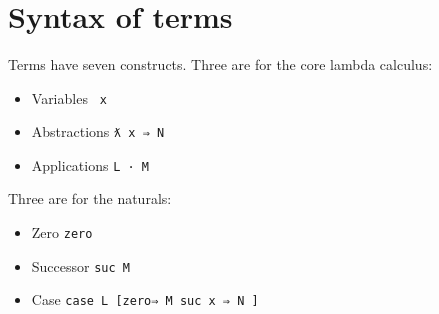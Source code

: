 \begin{fence}
\begin{code}
\AgdaSymbol{)}\<%
\\
\>[0]\AgdaSpace{}%
\AgdaSpace{}%
\AgdaSpace{}%
\AgdaSpace{}%
\AgdaSymbol{(}\AgdaSymbol{;}\AgdaSpace{}%
\AgdaSymbol{;}\AgdaSpace{}%
\AgdaSymbol{)}\<%
\\
\>[0]\AgdaSpace{}%
\AgdaSpace{}%
\AgdaSpace{}%
\AgdaSpace{}%
\AgdaSymbol{(}\AgdaSymbol{)}\<%
\\
\>[0]\AgdaSpace{}%
\AgdaSpace{}%
\AgdaSpace{}%
\AgdaSpace{}%
\AgdaSymbol{(}\AgdaSymbol{;}\AgdaSpace{}%
\AgdaSymbol{;}\AgdaSpace{}%
\AgdaSymbol{)}\<%
\end{code}
\end{fence}

\hypertarget{syntax-of-terms}{%
\section{Syntax of terms}\label{syntax-of-terms}}

Terms have seven constructs. Three are for the core lambda calculus:

\begin{itemize}
\tightlist
\item
  Variables \texttt{\textasciigrave{}\ x}
\item
  Abstractions \texttt{ƛ\ x\ ⇒\ N}
\item
  Applications \texttt{L\ ·\ M}
\end{itemize}

Three are for the naturals:

\begin{itemize}
\tightlist
\item
  Zero \texttt{\textasciigrave{}zero}
\item
  Successor \texttt{\textasciigrave{}suc\ M}
\item
  Case \texttt{case\ L\ {[}zero⇒\ M\ \textbar{}suc\ x\ ⇒\ N\ {]}}
\end{itemize}

